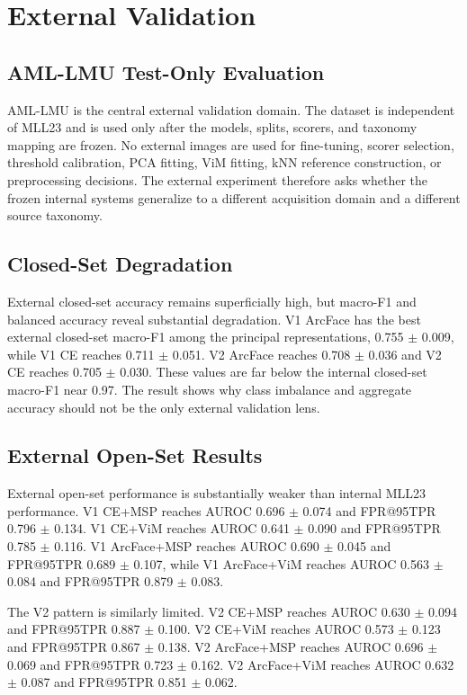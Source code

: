 \section{External Validation}

\subsection{AML-LMU Test-Only Evaluation}

AML-LMU is the central external validation domain. The dataset is independent of MLL23 and is used only after the models, splits, scorers, and taxonomy mapping are frozen. No external images are used for fine-tuning, scorer selection, threshold calibration, PCA fitting, ViM fitting, kNN reference construction, or preprocessing decisions. The external experiment therefore asks whether the frozen internal systems generalize to a different acquisition domain and a different source taxonomy.

\subsection{Closed-Set Degradation}

External closed-set accuracy remains superficially high, but macro-F1 and balanced accuracy reveal substantial degradation. V1 ArcFace has the best external closed-set macro-F1 among the principal representations, 0.755 $\pm$ 0.009, while V1 CE reaches 0.711 $\pm$ 0.051. V2 ArcFace reaches 0.708 $\pm$ 0.036 and V2 CE reaches 0.705 $\pm$ 0.030. These values are far below the internal closed-set macro-F1 near 0.97. The result shows why class imbalance and aggregate accuracy should not be the only external validation lens.

\subsection{External Open-Set Results}

External open-set performance is substantially weaker than internal MLL23 performance. V1 CE+MSP reaches AUROC 0.696 $\pm$ 0.074 and FPR@95TPR 0.796 $\pm$ 0.134. V1 CE+ViM reaches AUROC 0.641 $\pm$ 0.090 and FPR@95TPR 0.785 $\pm$ 0.116. V1 ArcFace+MSP reaches AUROC 0.690 $\pm$ 0.045 and FPR@95TPR 0.689 $\pm$ 0.107, while V1 ArcFace+ViM reaches AUROC 0.563 $\pm$ 0.084 and FPR@95TPR 0.879 $\pm$ 0.083.

The V2 pattern is similarly limited. V2 CE+MSP reaches AUROC 0.630 $\pm$ 0.094 and FPR@95TPR 0.887 $\pm$ 0.100. V2 CE+ViM reaches AUROC 0.573 $\pm$ 0.123 and FPR@95TPR 0.867 $\pm$ 0.138. V2 ArcFace+MSP reaches AUROC 0.696 $\pm$ 0.069 and FPR@95TPR 0.723 $\pm$ 0.162. V2 ArcFace+ViM reaches AUROC 0.632 $\pm$ 0.087 and FPR@95TPR 0.851 $\pm$ 0.062.

